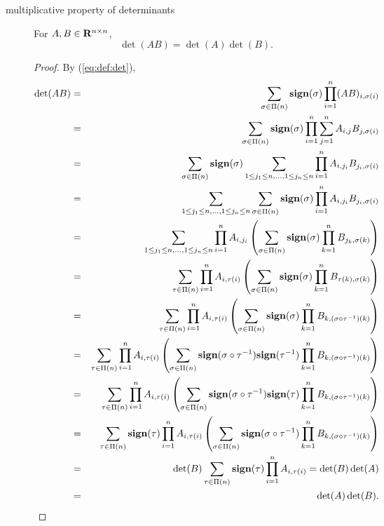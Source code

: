 \begin{description}
\item [multiplicative property of determinants]
For $A, B\in\mathbf{R}^{n\times n}$,
\begin{equation}
\det(AB) = \det(A) \det(B).
\end{equation}

\begin{proof}
By (\ref{eq:def:det}),
\begin{eqnarray*}
\det(AB)
&=&
\sum_{\sigma \in \Pi(n)} {\mathop{\bf sign}}(\sigma) \prod_{i=1}^n (AB)_{i, \sigma(i)}
\\
&=&
\sum_{\sigma \in \Pi(n)} {\mathop{\bf sign}}(\sigma) \prod_{i=1}^n \sum_{j=1}^n A_{i,j} B_{j, \sigma(i)}
\\
&=&
\sum_{\sigma \in \Pi(n)} {\mathop{\bf sign}}(\sigma) \sum_{1\leq j_1\leq n, \ldots, 1\leq j_n\leq n} \prod_{i=1}^n A_{i,j_i} B_{j_i, \sigma(i)}
\\
&=&
\sum_{1\leq j_1\leq n, \ldots, 1\leq j_n\leq n} \sum_{\sigma \in \Pi(n)} {\mathop{\bf sign}}(\sigma) \prod_{i=1}^n A_{i,j_i} B_{j_i, \sigma(i)}
\\
&=&
\sum_{1\leq j_1\leq n, \ldots, 1\leq j_n\leq n} \prod_{i=1}^n A_{i,j_i} \left( \sum_{\sigma \in \Pi(n)} {\mathop{\bf sign}}(\sigma) \prod_{k=1}^n B_{j_k, \sigma(k)} \right)
\\
&=&
\sum_{\tau\in\Pi(n)} \prod_{i=1}^n A_{i,\tau(i)} \left( \sum_{\sigma \in \Pi(n)} {\mathop{\bf sign}}(\sigma) \prod_{k=1}^n B_{\tau(k), \sigma(k)} \right)
\\
&=&
\sum_{\tau\in\Pi(n)} \prod_{i=1}^n A_{i,\tau(i)} \left( \sum_{\sigma \in \Pi(n)} {\mathop{\bf sign}}(\sigma) \prod_{k=1}^n B_{k, \left(\sigma\circ \tau^{-1} \right)(k)} \right)
\\
&=&
\sum_{\tau\in\Pi(n)} \prod_{i=1}^n A_{i,\tau(i)} \left( \sum_{\sigma \in \Pi(n)} {\mathop{\bf sign}}(\sigma\circ\tau^{-1}) {\mathop{\bf sign}}(\tau^{-1}) \prod_{k=1}^n B_{k, \left(\sigma\circ \tau^{-1} \right)(k)} \right)
\\
&=&
\sum_{\tau\in\Pi(n)} \prod_{i=1}^n A_{i,\tau(i)} \left( \sum_{\sigma \in \Pi(n)} {\mathop{\bf sign}}(\sigma\circ\tau^{-1}) {\mathop{\bf sign}}(\tau) \prod_{k=1}^n B_{k, \left(\sigma\circ \tau^{-1} \right)(k)} \right)
\\
&=&
\sum_{\tau\in\Pi(n)} {\mathop{\bf sign}}(\tau) \prod_{i=1}^n A_{i,\tau(i)} \left( \sum_{\sigma \in \Pi(n)} {\mathop{\bf sign}}(\sigma\circ\tau^{-1}) \prod_{k=1}^n B_{k, \left(\sigma\circ \tau^{-1} \right)(k)} \right)
\\
&=&
\det(B) \sum_{\tau\in\Pi(n)} {\mathop{\bf sign}}(\tau) \prod_{i=1}^n A_{i,\tau(i)}
= \det(B) \det(A)
\\
&=&
\det(A) \det(B).
\end{eqnarray*}
\end{proof}


\end{description}
